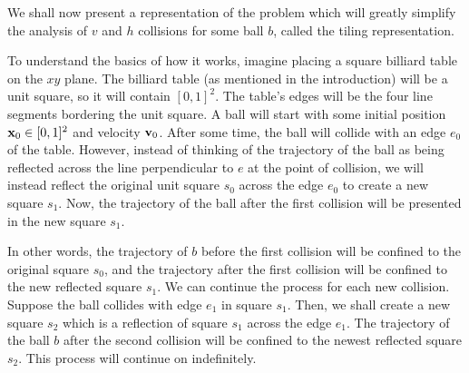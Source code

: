 We shall now present a representation of the problem which will greatly simplify the analysis of $v$ and $h$ collisions for some ball $b$, called the tiling representation.

To understand the basics of how it works, imagine placing a square billiard table on the $xy$ plane. The billiard table (as mentioned in the introduction) will be a unit square, so it will contain $[0,1]^2$. The table's edges will be the four line segments bordering the unit square. A ball will start with some initial position $\mathbf{x}_0 \in [0,1]^2$ and velocity $\mathbf{v}_0$. After some time, the ball will collide with an edge $e_0$ of the table. However, instead of thinking of the trajectory of the ball as being reflected across the line perpendicular to $e$ at the point of collision, we will instead reflect the original unit square $s_0$ across the edge $e_0$ to create a new square $s_1$. Now, the trajectory of the ball after the first collision will be presented in the new square $s_1$.

In other words, the trajectory of $b$ before the first collision will be confined to the original square $s_0$, and the trajectory after the first collision will be confined to the new reflected square $s_1$. We can continue the process for each new collision. Suppose the ball collides with edge $e_1$ in square $s_1$. Then, we shall create a new square $s_2$ which is a reflection of square $s_1$ across the edge $e_1$. The trajectory of the ball $b$ after the second collision will be confined to the newest reflected square $s_2$. This process will continue on indefinitely.

